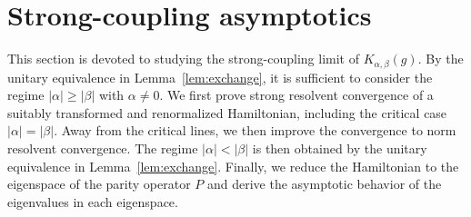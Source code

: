 \documentclass[12pt,dvipdfmx]{article}
\begin{document}
\section{Strong-coupling asymptotics}\label{s3}
%
%
%
This section is devoted to studying the strong-coupling limit of $K_{\alpha,\beta}(g)$.
By the unitary equivalence in Lemma~\ref{lem:exchange}, it is sufficient  to consider the regime $|\alpha|\ge|\beta|$ with $\alpha\ne0$. We first prove strong resolvent convergence of a suitably transformed and renormalized Hamiltonian, including the critical case $|\alpha|=|\beta|$. Away from the critical lines, we then improve the convergence to norm resolvent convergence. The regime $|\alpha|<|\beta|$ is then obtained by the unitary equivalence in Lemma~\ref{lem:exchange}. Finally, we reduce the Hamiltonian to the eigenspace of the parity operator $P$  and derive the asymptotic behavior of the eigenvalues in each eigenspace.
%
%
\end{document}

